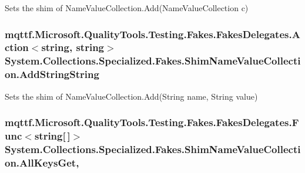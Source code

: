 Sets the shim of Name\-Value\-Collection.\-Add(\-Name\-Value\-Collection c)

\hypertarget{class_system_1_1_collections_1_1_specialized_1_1_fakes_1_1_shim_name_value_collection_ae9b8242856e0aa0a92fca2c19e1505ee}{
\subsubsection[{Add\-String\-String}]{\setlength{\rightskip}{0pt plus 5cm}mqttf.\-Microsoft.\-Quality\-Tools.\-Testing.\-Fakes.\-Fakes\-Delegates.\-Action$<$string, string$>$ System.\-Collections.\-Specialized.\-Fakes.\-Shim\-Name\-Value\-Collection.\-Add\-String\-String\hspace{0.3cm}{\ttfamily [set]}}}\label{class_system_1_1_collections_1_1_specialized_1_1_fakes_1_1_shim_name_value_collection_ae9b8242856e0aa0a92fca2c19e1505ee}


Sets the shim of Name\-Value\-Collection.\-Add(\-String name, String value)

\hypertarget{class_system_1_1_collections_1_1_specialized_1_1_fakes_1_1_shim_name_value_collection_aee4ca68285522ac58dcc1983b60dc58a}{
\subsubsection[{All\-Keys\-Get}]{\setlength{\rightskip}{0pt plus 5cm}mqttf.\-Microsoft.\-Quality\-Tools.\-Testing.\-Fakes.\-Fakes\-Delegates.\-Func$<$string\mbox{[}$\,$\mbox{]}$>$ System.\-Collections.\-Specialized.\-Fakes.\-Shim\-Name\-Value\-Collection.\-All\-Keys\-Get\hspace{0.3cm}{\ttfamily [get]}, {\ttfamily [set]}}}\label{class_system_1_1_collections_1_1_specialized_1_1_fakes_1_1_shim_name_value_collection_aee4ca68285522ac58dcc1983b60dc58a}


